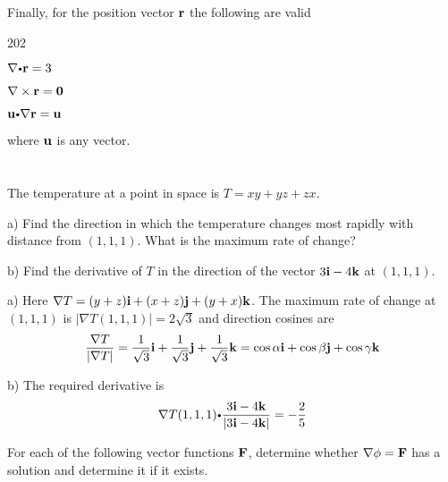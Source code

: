 Finally, for the position vector $\mathbf{  r}$ the following 
are valid
 \begin{dingautolist}{202}
\item $\nabla \bp \vector{ r} = 3$
\item $ \nabla \times \mathbf{  r} = \mathbf{  0}$
\item $ \vector{u} \bp \nabla \vector{ r} = \vector{u}$
\end{dingautolist}
where $\mathbf{ u}$ is any vector.



\section*{}
\begin{multicols}{2}\columnseprule 1pt \columnsep 25pt

\begin{problem}

The temperature at a point in space is $T = xy + yz + zx$.

a) Find the direction in which the temperature changes most rapidly with 
distance from $(1,1,1)$. What is the maximum rate of change?

b) Find the derivative of $T$ in the direction of the vector 
$3 \mathbf{  i} - 4 \mathbf{  k}$ at $(1,1,1)$.


\begin{answer}
a) Here $\nabla T = (y+z) \mathbf{  i} + (x+z) \mathbf{  j} + (y+x) \mathbf{  k}$. 
The maximum rate of change at $(1,1,1)$ is 
$|\nabla T(1,1,1)| = 2 \sqrt{3}$ and direction cosines are
\begin{eqnarray*}
\dfrac{\nabla T}{|\nabla T|} = 
\dfrac{1}{\sqrt{3}} \mathbf{  i} +
\dfrac{1}{\sqrt{3}} \mathbf{  j} +
\dfrac{1}{\sqrt{3}} \mathbf{  k} =
\cos \alpha \mathbf{  i} + \cos \beta \mathbf{  j} + \cos \gamma \mathbf{  k}
\end{eqnarray*}


b) The required derivative is
\begin{eqnarray*}
\nabla T(1,1,1) \bp 
\dfrac{3 \vector{ i} - 4 \vector{ k}}{|3 \vector{ i} - 4 \vector{ k}|} =
- \dfrac{2}{5}
\end{eqnarray*}

\end{answer}
\end{problem}

\begin{problem}

For each of the following vector functions $\mathbf{  F}$, 
determine whether $\nabla \phi = \mathbf{  F}$ has a solution and 
determine it if it exists.


\end{problem}
\end{multicols}
